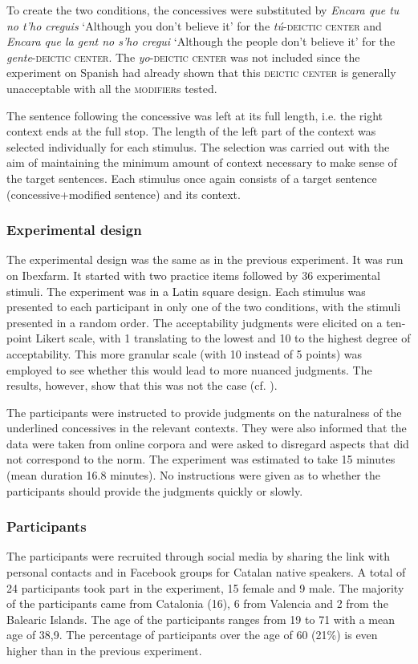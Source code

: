 To create the two conditions, the concessives were substituted by \textit{Encara que tu no t'ho creguis} `Although you don't believe it' for the \textit{tú}-\textsc{deictic center} and \textit{Encara que la gent no s'ho cregui} `Although the people don't believe it' for the \textit{gente}-\textsc{deictic center}. The \textit{yo}-\textsc{deictic center} was not included since the experiment on Spanish had already shown that this \textsc{deictic center} is generally unacceptable with all the \textsc{modifier}s tested.


The sentence following the concessive was left at  its full length, i.e. the right context ends at the full stop. The length of the left part of the context was selected individually for each stimulus. The selection was carried out with the aim of maintaining the minimum amount of context necessary to make sense of the target sentences.
Each stimulus once again consists of a target sentence (concessive+modified sentence) and its context.

\subsubsection{Experimental design}
The experimental design was the same as in the previous experiment. It was run on Ibexfarm. It started with two practice items followed by 36 experimental stimuli. The experiment was in a Latin square design. Each stimulus was presented to each participant in only one of the two conditions, with the stimuli presented in a random order. The acceptability judgments were elicited on a ten-point Likert scale, with 1 translating to the lowest and 10 to the highest degree of acceptability. This more granular scale (with 10 instead of 5 points)  was employed to see whether this would lead to more nuanced judgments. The results, however, show that this was not the case (cf. ).

The participants were instructed to provide judgments on the naturalness of the underlined concessives in the relevant contexts. They were also informed that the data were taken from online corpora and were asked to disregard aspects that did not correspond to the norm. The experiment was estimated to take 15 minutes (mean duration 16.8 minutes). No instructions were given as to whether the participants should provide the judgments quickly or slowly.
\subsubsection{Participants} The participants were recruited through social media by sharing the link with personal contacts and in Facebook groups for Catalan native speakers.  A total of 24 participants took part in the experiment, 15  female and 9 male. The majority of the participants came from Catalonia (16),  6 from Valencia and  2 from the Balearic Islands. The age of the participants ranges from 19 to 71 with a mean age of 38,9. The percentage of participants over the age of 60 (21\%) is even higher than in the previous experiment. 
